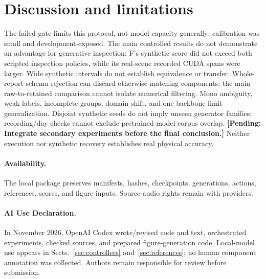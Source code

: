 \documentclass[runningheads,orivec]{llncs}
\newcommand{\pending}[1]{\iffinalresults
  \PackageError{research-results}{Unresolved result or protocol marker}{Resolve the marked item from recorded evidence before submission.}%
  \else\textbf{[Pending: #1]}\fi}
\newif\iffinalresults
\begin{document}
\section{Discussion and limitations}
The failed gate limits this protocol, not model capacity generally: calibration was small and development-exposed. The main controlled results do not demonstrate an advantage for generative inspection: F's synthetic score did not exceed both scripted inspection policies, while its real-scene recorded CUDA spans were larger. Wide synthetic intervals do not establish equivalence or transfer. Whole-report schema rejection can discard otherwise matching components; the main raw-to-retained comparison cannot isolate numerical filtering. Mono ambiguity, weak labels, incomplete groups, domain shift, and one backbone limit generalization. Disjoint synthetic seeds do not imply unseen generator families; recording/day checks cannot exclude pretrained-model corpus overlap. \pending{Integrate secondary experiments before the final conclusion.} Neither execution nor synthetic recovery establishes real physical accuracy.

\paragraph{Availability.} The local package preserves manifests, hashes, checkpoints, generations, actions, references, scores, and figure inputs. Source-audio rights remain with providers.

\paragraph{AI Use Declaration.} In November 2026, OpenAI Codex wrote/revised code and text, orchestrated experiments, checked sources, and prepared figure-generation code. Local-model use appears in Sects.~\ref{sec:controllers} and~\ref{sec:references}; no human component annotation was collected. Authors remain responsible for review before submission.



\end{document}
